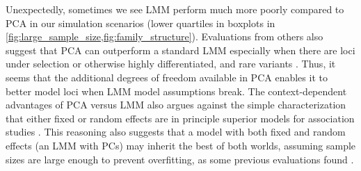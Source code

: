 \documentclass[11pt]{article}
\begin{document}
Unexpectedly, sometimes we see LMM perform much more poorly compared to PCA in our simulation scenarios (lower quartiles in boxplots in \cref{fig:large_sample_size,fig:family_structure}).
Evaluations from others also suggest that PCA can outperform a standard LMM especially when there are loci under selection or otherwise highly differentiated, and rare variants \citep{price_new_2010, wu_comparison_2011, yang_advantages_2014}.
Thus, it seems that the additional degrees of freedom available in PCA enables it to better model loci when LMM model assumptions break.
The context-dependent advantages of PCA versus LMM also argues against the simple characterization that either fixed or random effects are in principle superior models for association studies \citep{price_new_2010, sul_mixed_2013, price_response_2013, sul_population_2018}.
This reasoning also suggests that a model with both fixed and random effects (an LMM with PCs) may inherit the best of both worlds, assuming sample sizes are large enough to prevent overfitting, as some previous evaluations found \citep{zhao_arabidopsis_2007, price_new_2010}.

\printbibliography
\end{document}
